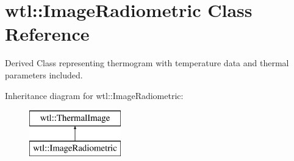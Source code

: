 \hypertarget{classwtl_1_1_image_radiometric}{}\section{wtl\+:\+:Image\+Radiometric Class Reference}
\label{classwtl_1_1_image_radiometric}


Derived Class representing thermogram with temperature data and thermal parameters included.  


Inheritance diagram for wtl\+:\+:Image\+Radiometric\+:\begin{figure}[H]
\begin{center}
\leavevmode
\includegraphics[height=2.000000cm]{classwtl_1_1_image_radiometric}
\end{center}
\end{figure}
